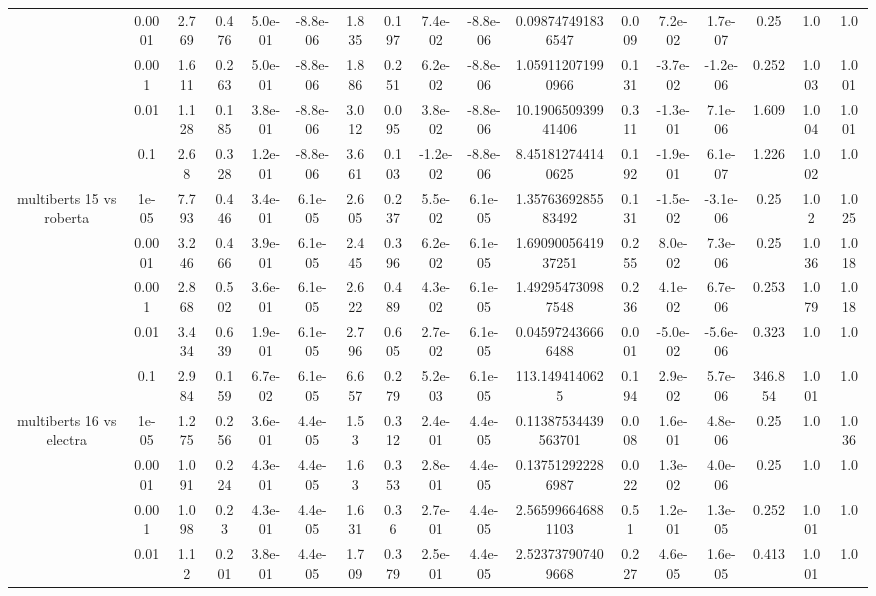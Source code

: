 \begin{tabular}{|c|c|c|c|c|c|c|c|c|c|c|c|c|c|c|c|c|}
 & 0.0001 & 2.769 & 0.476 & 5.0e-01 & -8.8e-06 & 1.835 & 0.197 & 7.4e-02 & -8.8e-06 & 0.098747491836547 & 0.009 & 7.2e-02 & 1.7e-07 & 0.25 & 1.0 & 1.0 \\
 & 0.001 & 1.611 & 0.263 & 5.0e-01 & -8.8e-06 & 1.886 & 0.251 & 6.2e-02 & -8.8e-06 & 1.059112071990966 & 0.131 & -3.7e-02 & -1.2e-06 & 0.252 & 1.003 & 1.001 \\
 & 0.01 & 1.128 & 0.185 & 3.8e-01 & -8.8e-06 & 3.012 & 0.095 & 3.8e-02 & -8.8e-06 & 10.190650939941406 & 0.311 & -1.3e-01 & 7.1e-06 & 1.609 & 1.004 & 1.001 \\
 & 0.1 & 2.68 & 0.328 & 1.2e-01 & -8.8e-06 & 3.661 & 0.103 & -1.2e-02 & -8.8e-06 & 8.451812744140625 & 0.192 & -1.9e-01 & 6.1e-07 & 1.226 & 1.002 & 1.0 \\
\hline
\multirow{5}{*}{multiberts 15 vs roberta } & 1e-05 & 7.793 & 0.446 & 3.4e-01 & 6.1e-05 & 2.605 & 0.237 & 5.5e-02 & 6.1e-05 & 1.3576369285583492 & 0.131 & -1.5e-02 & -3.1e-06 & 0.25 & 1.02 & 1.025 \\
 & 0.0001 & 3.246 & 0.466 & 3.9e-01 & 6.1e-05 & 2.445 & 0.396 & 6.2e-02 & 6.1e-05 & 1.6909005641937251 & 0.255 & 8.0e-02 & 7.3e-06 & 0.25 & 1.036 & 1.018 \\
 & 0.001 & 2.868 & 0.502 & 3.6e-01 & 6.1e-05 & 2.622 & 0.489 & 4.3e-02 & 6.1e-05 & 1.492954730987548 & 0.236 & 4.1e-02 & 6.7e-06 & 0.253 & 1.079 & 1.018 \\
 & 0.01 & 3.434 & 0.639 & 1.9e-01 & 6.1e-05 & 2.796 & 0.605 & 2.7e-02 & 6.1e-05 & 0.045972436666488 & 0.001 & -5.0e-02 & -5.6e-06 & 0.323 & 1.0 & 1.0 \\
 & 0.1 & 2.984 & 0.159 & 6.7e-02 & 6.1e-05 & 6.657 & 0.279 & 5.2e-03 & 6.1e-05 & 113.1494140625 & 0.194 & 2.9e-02 & 5.7e-06 & 346.854 & 1.001 & 1.0 \\
\hline
\multirow{5}{*}{multiberts 16 vs electra } & 1e-05 & 1.275 & 0.256 & 3.6e-01 & 4.4e-05 & 1.53 & 0.312 & 2.4e-01 & 4.4e-05 & 0.11387534439563701 & 0.008 & 1.6e-01 & 4.8e-06 & 0.25 & 1.0 & 1.036 \\
 & 0.0001 & 1.091 & 0.224 & 4.3e-01 & 4.4e-05 & 1.63 & 0.353 & 2.8e-01 & 4.4e-05 & 0.137512922286987 & 0.022 & 1.3e-02 & 4.0e-06 & 0.25 & 1.0 & 1.0 \\
 & 0.001 & 1.098 & 0.23 & 4.3e-01 & 4.4e-05 & 1.631 & 0.36 & 2.7e-01 & 4.4e-05 & 2.565996646881103 & 0.51 & 1.2e-01 & 1.3e-05 & 0.252 & 1.001 & 1.0 \\
 & 0.01 & 1.12 & 0.201 & 3.8e-01 & 4.4e-05 & 1.709 & 0.379 & 2.5e-01 & 4.4e-05 & 2.523737907409668 & 0.227 & 4.6e-05 & 1.6e-05 & 0.413 & 1.001 & 1.0 \\

\end{tabular}
